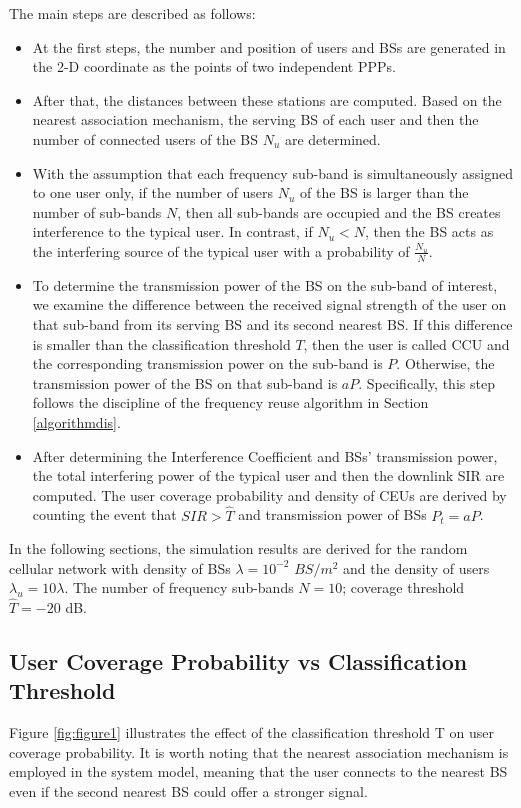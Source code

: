 \documentclass{svproc}
\begin{document}
The main steps are described as follows:
\begin{itemize}
	\item At the first steps, the number and position of users and BSs are generated in the 2-D coordinate as the points of two independent PPPs.
	\item After that, the distances between these stations are computed. Based on the nearest association mechanism, the serving BS of each user and then the number of connected users of the BS $N_u$ are determined. 
	\item With the assumption that each frequency sub-band is simultaneously assigned to one user only, if the number of users $N_u$ of the BS is larger than the number of sub-bands $N$, then all sub-bands are occupied and the BS creates interference to the typical user. In contrast, if $N_u<N$, then the BS acts as the interfering source of the typical user with a probability of $\frac{N_u}{N}$. 
	\item To determine the transmission power of the BS on the sub-band of interest, we examine the difference between the received signal strength of the user on that sub-band from its serving BS and its second nearest BS. If this difference is smaller than the classification threshold $T$, then the user is called CCU and the corresponding transmission power on the sub-band is $P$. Otherwise, the transmission power of the BS on that sub-band is $ aP$. Specifically, this step follows the discipline of the frequency reuse algorithm in Section \ref{algorithmdis}.
	\item After determining the Interference Coefficient and BSs' transmission power, the total interfering power of the typical user and then the downlink SIR are computed.  The user coverage probability and density of CEUs are derived by counting the event that $SIR > \hat{T}$ and transmission power of BSs $P_t = aP$.
\end{itemize}

In the following sections, the simulation results are derived for the random cellular network with density of BSs $\lambda = 10^{-2}$ $BS/m^2$ and the density of users $\lambda_u = 10 \lambda$. The number of frequency sub-bands $N=10$; coverage threshold $\hat{T}=-20$ dB. 
\subsection{User Coverage Probability vs Classification Threshold}
Figure \ref{fig:figure1} illustrates the effect of the classification threshold T on user coverage probability. It is worth noting that the nearest association mechanism is employed in the system model, meaning that the user connects to the nearest BS even if the second nearest BS could offer a stronger signal.
\end{document}
